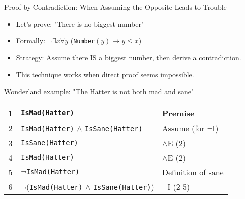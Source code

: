 \documentclass{beamer}
\begin{document}
	\begin{frame}{Proof by Contradiction: When Assuming the Opposite Leads to Trouble}
		\begin{itemize}
			\item Let's prove: "There is no biggest number"
			\item Formally: $\neg \exists x \forall y$ (\texttt{Number}$(y) \rightarrow y \leq x$)
			\item Strategy: Assume there IS a biggest number, then derive a contradiction.
			\item This technique works when direct proof seems impossible.
		\end{itemize}
		
		\begin{example}
			Wonderland example: "The Hatter is not both mad and sane"
			\begin{tabular}{|c|l|l|}
				\hline
				1 & \texttt{IsMad(Hatter)} & Premise \\
				\hline
				2 & \quad \texttt{IsMad(Hatter)} $\land$ \texttt{IsSane(Hatter)} & Assume (for $\neg$I) \\
				3 & \quad \texttt{IsSane(Hatter)} & $\land$E (2) \\
				4 & \quad \texttt{IsMad(Hatter)} & $\land$E (2) \\
				5 & \quad $\neg$\texttt{IsMad(Hatter)} & Definition of sane \\
				\hline
				6 & $\neg$(\texttt{IsMad(Hatter)} $\land$ \texttt{IsSane(Hatter)}) & $\neg$I (2-5) \\
				\hline
			\end{tabular}
		\end{example}
	\end{frame}
	
\end{document}
